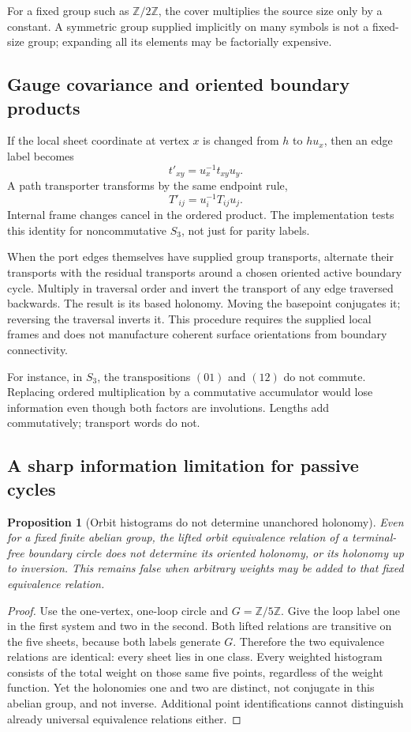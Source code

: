 \documentclass[11pt]{article}
\newtheorem{proposition}[theorem]{Proposition}
\theoremstyle{definition}\newtheorem{definition}[theorem]{Definition}\newtheorem{example}[theorem]{Example}
\theoremstyle{remark}\newtheorem{remark}[theorem]{Remark}
\newcommand{\Z}{\mathbb Z}
\begin{document}
For a fixed group such as $\Z/2\Z$, the cover multiplies the source size only by a constant. A symmetric group supplied implicitly on many symbols is not a fixed-size group; expanding all its elements may be factorially expensive.

\subsection{Gauge covariance and oriented boundary products}
If the local sheet coordinate at vertex $x$ is changed from $h$ to $h u_x$, then an edge label becomes
\[
                          t'_{xy}=u_x^{-1}t_{xy}u_y.
\]
A path transporter transforms by the same endpoint rule,
\begin{equation}\label{eq:gauge}
                       T'_{ij}=u_i^{-1}T_{ij}u_j.
\end{equation}
Internal frame changes cancel in the ordered product. The implementation tests this identity for noncommutative $S_3$, not just for parity labels.

When the port edges themselves have supplied group transports, alternate their transports with the residual transports around a chosen oriented active boundary cycle. Multiply in traversal order and invert the transport of any edge traversed backwards. The result is its based holonomy. Moving the basepoint conjugates it; reversing the traversal inverts it. This procedure requires the supplied local frames and does not manufacture coherent surface orientations from boundary connectivity.

For instance, in $S_3$, the transpositions $(01)$ and $(12)$ do not commute. Replacing ordered multiplication by a commutative accumulator would lose information even though both factors are involutions. Lengths add commutatively; transport words do not.

\subsection{A sharp information limitation for passive cycles}
\begin{proposition}[Orbit histograms do not determine unanchored holonomy]
\label{prop:passivebarrier}
Even for a fixed finite abelian group, the lifted orbit equivalence relation of a terminal-free boundary circle does not determine its oriented holonomy, or its holonomy up to inversion. This remains false when arbitrary weights may be added to that fixed equivalence relation.
\end{proposition}
\begin{proof}
Use the one-vertex, one-loop circle and $G=\Z/5\Z$. Give the loop label one in the first system and two in the second. Both lifted relations are transitive on the five sheets, because both labels generate $G$. Therefore the two equivalence relations are identical: every sheet lies in one class. Every weighted histogram consists of the total weight on those same five points, regardless of the weight function. Yet the holonomies one and two are distinct, not conjugate in this abelian group, and not inverse. Additional point identifications cannot distinguish already universal equivalence relations either.
\end{proof}
\end{document}
